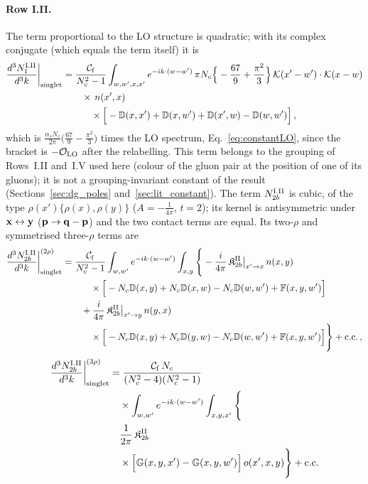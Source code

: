 \paragraph{Row I.II.} The term proportional to the LO structure is quadratic; with its complex conjugate (which equals the term itself) it is
\begin{align}\label{eq:sIIa}
\frac{d^3N^{\rm I.II}_1}{d^3k}\bigg|_{\rm singlet}&=\frac{\mathcal C_{\rm f}}{N_c^2-1}\int_{w,w',x,x'}e^{-ik\cdot(w-w')}\,\pi N_c\Big\{-\frac{67}{9}+\frac{\pi^2}{3}\Big\}\,\mathcal{K}(x'-w')\cdot\mathcal{K}(x-w)\notag\\
&\qquad\times\,n(x',x)\notag\\
&\qquad\quad\times\Big[-\mathbb{D}(x,x')+\mathbb{D}(x,w')+\mathbb{D}(x',w)-\mathbb{D}(w,w')\Big]\,,
\end{align}
which is $\frac{\alpha_sN_c}{2\pi}\big(\frac{67}{9}-\frac{\pi^2}{3}\big)$ times the LO spectrum, Eq.~\eqref{eq:constantLO}, since the bracket is $-\mathcal O_{\rm LO}$ after the relabelling. This term belongs to the grouping of Rows~I.II and~I.V used here (colour of the gluon pair at the position of one of its gluons); it is not a grouping-invariant constant of the result (Sections~\ref{sec:dg_poles} and~\ref{sec:lit_constant}). The term $N^{\rm I.II}_{2b}$ is cubic, of the type $\rho(x')\{\rho(x),\rho(y)\}$ ($A=-\frac{1}{4\pi}$, $t=2$); its kernel is antisymmetric under $\mathbf{x}\leftrightarrow\mathbf{y}$ ($\mathbf{p}\to\mathbf{q}-\mathbf{p}$) and the two contact terms are equal. Its two-$\rho$ and symmetrised three-$\rho$ terms are
\begin{align}\label{eq:sIIb}
\frac{d^3N^{\rm I.II}_{2b}}{d^3k}\bigg|^{(2\rho)}_{\rm singlet}&=\frac{\mathcal C_{\rm f}}{N_c^2-1}\int_{w,w'}e^{-ik\cdot(w-w')}\int_{x,y}\Bigg\{-\frac{i}{4\pi}\,\mathfrak K^{\rm II}_{2b}\big|_{x'\to x}\,n(x,y)\notag\\
&\qquad\quad\times\Big[-N_c\mathbb{D}(x,y)+N_c\mathbb{D}(x,w)-N_c\mathbb{D}(w,w')+\mathbb{F}(x,y,w')\Big]\notag\\
&\qquad+\frac{i}{4\pi}\,\mathfrak K^{\rm II}_{2b}\big|_{x'\to y}\,n(y,x)\notag\\
&\qquad\quad\times\Big[-N_c\mathbb{D}(x,y)+N_c\mathbb{D}(y,w)-N_c\mathbb{D}(w,w')+\mathbb{F}(x,y,w')\Big]\Bigg\}+{\rm c.c.}\,,
\end{align}
\begin{align}\label{eq:oIIb}
\frac{d^3N^{\rm I.II}_{2b}}{d^3k}\bigg|^{(3\rho)}_{\rm singlet}&=\frac{\mathcal C_{\rm f}\,N_c}{(N_c^2-4)(N_c^2-1)}\notag\\
&\quad\times\int_{w,w'}e^{-ik\cdot(w-w')}\int_{x,y,x'}\Bigg\{\notag\\
&\quad\frac{1}{2\pi}\,\mathfrak K^{\rm II}_{2b}\notag\\
&\quad\times\Big[\mathbb{G}(x,y,x')-\mathbb{G}(x,y,w')\Big]\,o(x',x,y)\Bigg\}+{\rm c.c.}
\end{align}

